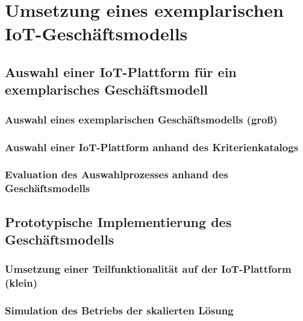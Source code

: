 \chapter{Umsetzung eines exemplarischen IoT-Geschäftsmodells}\label{ch:Umsetzung eines exemplarischen IoT-Geschäftsmodells}
\section{Auswahl einer IoT-Plattform für ein exemplarisches Geschäftsmodell}\label{sec:Auswahl einer IoT-Plattform für ein exemplarisches Geschäftsmodell}
\subsection{Auswahl eines exemplarischen Geschäftsmodells (groß)}\label{subsec:Auswahl eines exemplarischen Geschäftsmodells (groß)}
\subsection{Auswahl einer IoT-Plattform anhand des Kriterienkatalogs}\label{subsec:Auswahl einer IoT-Plattform anhand des Kriterienkatalogs}
\subsection{Evaluation des Auswahlprozesses anhand des Geschäftsmodells}\label{subsec:Evaluation des Auswahlprozesses anhand des Geschäftsmodells}
\section{Prototypische Implementierung des Geschäftsmodells}\label{sec:Prototypische Implementierung des Geschäftsmodells}
\subsection{Umsetzung einer Teilfunktionalität auf der IoT-Plattform (klein)}\label{subsec:Umsetzung einer Teilfunktionalität auf der IoT-Plattform (klein)}
\subsection{Simulation des Betriebs der skalierten Lösung}\label{subsec:Simulation des Betriebs der skalierten Lösung}
